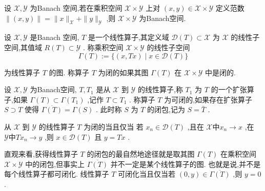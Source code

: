 \documentclass[lang=cn,newtx,10pt,scheme=chinese,thmcnt=chapter]{elegantbook}
\begin{document}
设 \(\mathcal{X},\mathcal{Y}\) 为Banach 空间,若在乘积空间 \(\mathcal{X} \times  \mathcal{Y}\) 上对 \(\left( {x,y}\right)  \in  \mathcal{X} \times  \mathcal{Y}\) 定义范数 \(\parallel \left( {x,y}\right) \parallel  = \parallel x{\parallel }_{\mathcal{X}} + \parallel y{\parallel }_{\mathcal{Y}}\) ,则 \(\mathcal{X} \times  \mathcal{Y}\) 为Banach空间.
\begin{definition}
    设 \(\mathcal{X},\mathcal{Y}\) 是Banach 空间, \(T\) 是一个线性算子,其定义域 \(\mathcal{D}(T)  \subset  \mathcal{X}\) 为 \(\mathcal{X}\) 的线性子空间,其值域 \(R\left( T\right)  \subset  \mathcal{Y}\) . 称乘积空间 \(\mathcal{X} \times  \mathcal{Y}\) 的线性子空间
\begin{equation*}
\Gamma \left( T\right)  \mathrel{\text{ := }} \{ \left( {x,{Tx}}\right)  \mid  x \in  \mathcal{D}(T) \}
\end{equation*}

为线性算子 \(T\) 的图. 称算子 \(T\) 为闭的如果其图 \(\Gamma \left( T\right)\) 在 \(\mathcal{X} \times  \mathcal{Y}\) 中是闭的.

\end{definition}
\begin{definition}
    设 \(\mathcal{X},\mathcal{Y}\) 为Banach空间, \(T,{T}_{1}\) 是从 \(\mathcal{X}\) 到 \(\mathcal{Y}\) 的线性算子,称 \({T}_{1}\) 为 \(T\) 的一个扩张算子,如果 \(\Gamma \left( T\right)  \subset  \Gamma \left( {T}_{1}\right)\) ,记作 \(T \subset  {T}_{1}\) . 称算子 \(T\) 为可闭的,如果存在扩张算子 \(S \supset  T\) 使得 \(\overline{\Gamma \left( T\right) } = \Gamma \left( S\right)\) . 此时称 \(S\) 为 \(T\) 的闭包,记为 \(S = \bar{T}\) .
\end{definition}
\begin{note}
    从 \(\mathcal{X}\) 到 \(\mathcal{Y}\) 的线性算子 \(T\) 为闭的当且仅当
若 \({x}_{n} \in  \mathcal{D}(T)\) ,且在 \(\mathcal{X} \textbf{中} {x}_{n} \rightarrow  x\) ,在 \(\mathcal{Y} \text{中}T{x}_{n} \rightarrow  y\) ,则 \(x \in  \mathcal{D}(T)\) 且 \(y = {Tx}\) .

 直观来看,获得线性算子 \(T\) 的闭包的最自然地途径就是取其图 \(\Gamma \left( T\right)\) 在乘积空间 \(\mathcal{X} \times  \mathcal{Y}\) 中的闭包,但事实上 \(\overline{\Gamma \left( T\right) }\) 并不一定是某个线性算子的图. 也就是说,并不是每个线性算子都可闭化. 线性算子 \(T\) 可闭化当且仅当若 \(\left( {0,y}\right)  \in  \overline{\Gamma \left( T\right) }\) ,则 \(y = 0\) .

\end{note}
\end{document}
